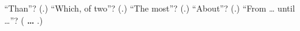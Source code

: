 \begin{tcolorbox}[breakable,colback=teal!4,colframe=teal!35!black,title={Before you move on}]
\textquotedblleft{}Than\textquotedblright{}? (\textbf{}.) \textquotedblleft{}Which, of two\textquotedblright{}? (\textbf{}.) \textquotedblleft{}The most\textquotedblright{}? (\textbf{}.) \textquotedblleft{}About\textquotedblright{}? (\textbf{}.) \textquotedblleft{}From … until …\textquotedblright{}? (\textbf{ … }.)
\end{tcolorbox}
